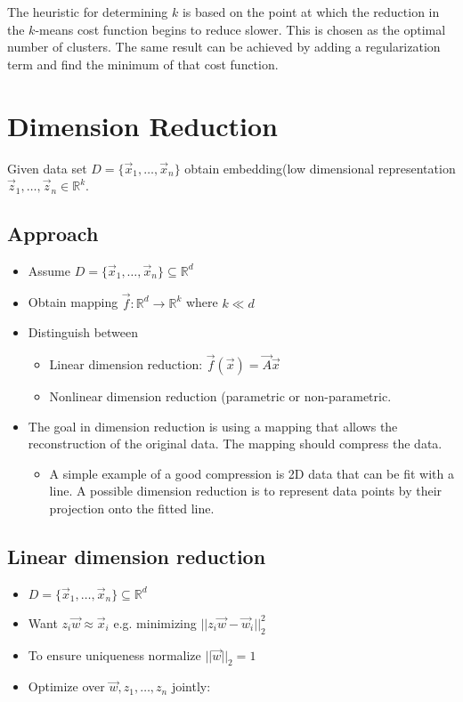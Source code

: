 \documentclass[10pt,a4paper]{scrartcl}
\begin{document}
\begin{multicols*}{2}
The heuristic for determining $k$ is based on the point at which the reduction in the $k$-means cost function begins to reduce slower. This is chosen as the optimal number of clusters. The same result can be achieved by adding a regularization term and find the minimum of that cost function.

\section{Dimension Reduction}

Given data set $D=\{\vec{x}_1,\ldots,\vec{x}_n\}$ obtain \glqq embedding\grqq (low dimensional representation $\vec{z}_1,\ldots,\vec{z}_n\in\mathbb{R}^k$.

\subsection{Approach}

\begin{itemize}
\item Assume $D=\{\vec{x}_1,\dots,\vec{x}_n\}\subseteq\mathbb{R}^d$
\item Obtain mapping $\vec{f}:\mathbb{R}^d\rightarrow\mathbb{R}^k$ where $k\ll d$
\item Distinguish between
\begin{itemize}
\item Linear dimension reduction: $\vec{f}(\vec{x})=\vec{A}\vec{x}$
\item Nonlinear dimension reduction (parametric or non-parametric.
\end{itemize}
\item The goal in dimension reduction is using a mapping that allows the reconstruction of the original data. The mapping should compress the data.
\begin{itemize}
\item A simple example of a good compression is 2D data that can be fit with a line. A possible dimension reduction is to represent data points by their projection onto the fitted line.
\end{itemize}
\end{itemize}

\subsection{Linear dimension reduction}

\begin{itemize}
\item $D=\{\vec{x}_1,\ldots,\vec{x}_n\}\subseteq\mathbb{R}^d$
\item Want $z_i\vec{w}\approx\vec{x}_i$ e.g. minimizing $||z_i\vec{w}-\vec{w}_i||_2^2$
\item To ensure uniqueness normalize $||\vec{w}||_2 = 1$
\item Optimize over $\vec{w},z_1,\ldots,z_n$ jointly:


\end{itemize}
\end{multicols*}
\end{document}
